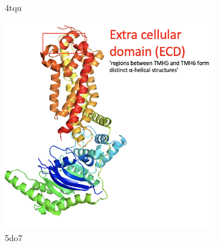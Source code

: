 \begin{figure}[htb]
\begin{subfigure}{0.25\textwidth}
  \caption{4tqu}
  \label{fig:4tqu}
\end{subfigure}\hfil %
\begin{subfigure}{0.25\textwidth}
  \includegraphics[width=\linewidth]{introduction/5do7.png}
  \caption{5do7}
  \label{fig:5do7}
\end{subfigure}\hfil %
\begin{subfigure}{0.25\textwidth}

\end{subfigure}
\end{figure}
